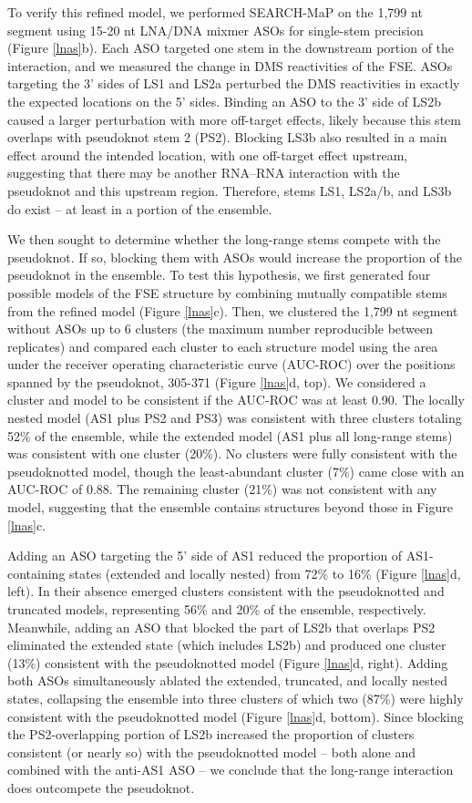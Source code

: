\documentclass[main.tex]{subfiles}
\begin{document}
To verify this refined model, we performed SEARCH-MaP on the 1,799 nt segment using 15-20 nt LNA/DNA mixmer ASOs for single-stem precision (Figure \ref{lnas}b).
Each ASO targeted one stem in the downstream portion of the interaction, and we measured the change in DMS reactivities of the FSE.
ASOs targeting the 3' sides of LS1 and LS2a perturbed the DMS reactivities in exactly the expected locations on the 5' sides.
Binding an ASO to the 3' side of LS2b caused a larger perturbation with more off-target effects, likely because this stem overlaps with pseudoknot stem 2 (PS2).
Blocking LS3b also resulted in a main effect around the intended location, with one off-target effect upstream, suggesting that there may be another RNA--RNA interaction with the pseudoknot and this upstream region.
Therefore, stems LS1, LS2a/b, and LS3b do exist -- at least in a portion of the ensemble.

We then sought to determine whether the long-range stems compete with the pseudoknot.
If so, blocking them with ASOs would increase the proportion of the pseudoknot in the ensemble.
To test this hypothesis, we first generated four possible models of the FSE structure by combining mutually compatible stems from the refined model (Figure \ref{lnas}c).
Then, we clustered the 1,799 nt segment without ASOs up to 6 clusters (the maximum number reproducible between replicates) and compared each cluster to each structure model using the area under the receiver operating characteristic curve (AUC-ROC) over the positions spanned by the pseudoknot, 305-371 (Figure \ref{lnas}d, top).
We considered a cluster and model to be consistent if the AUC-ROC was at least 0.90.
The locally nested model (AS1 plus PS2 and PS3) was consistent with three clusters totaling 52\% of the ensemble, while the extended model (AS1 plus all long-range stems) was consistent with one cluster (20\%).
No clusters were fully consistent with the pseudoknotted model, though the least-abundant cluster (7\%) came close with an AUC-ROC of 0.88.
The remaining cluster (21\%) was not consistent with any model, suggesting that the ensemble contains structures beyond those in Figure \ref{lnas}c.

Adding an ASO targeting the 5' side of AS1 reduced the proportion of AS1-containing states (extended and locally nested) from 72\% to 16\% (Figure \ref{lnas}d, left).
In their absence emerged clusters consistent with the pseudoknotted and truncated models, representing 56\% and 20\% of the ensemble, respectively.
Meanwhile, adding an ASO that blocked the part of LS2b that overlaps PS2 eliminated the extended state (which includes LS2b) and produced one cluster (13\%) consistent with the pseudoknotted model (Figure \ref{lnas}d, right).
Adding both ASOs simultaneously ablated the extended, truncated, and locally nested states, collapsing the ensemble into three clusters of which two (87\%) were highly consistent with the pseudoknotted model (Figure \ref{lnas}d, bottom).
Since blocking the PS2-overlapping portion of LS2b increased the proportion of clusters consistent (or nearly so) with the pseudoknotted model -- both alone and combined with the anti-AS1 ASO -- we conclude that the long-range interaction does outcompete the pseudoknot.
\end{document}
